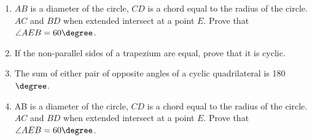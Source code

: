 \begin{enumerate}[label=\thesubsection.\arabic*,ref=\thesubsection.\theenumi]
\item $AB$ is a diameter of the circle, $CD$ is a chord equal to the radius of the circle. $AC$ and $BD$ when extended intersect at a point $E$. Prove that $\angle AEB = 60\degree$.
\item If the non-parallel sides of a trapezium are equal, prove that it is cyclic.
\item  The sum of either pair of opposite angles of a cyclic quadrilateral is 180$\degree$.
\item AB is a diameter of the circle, $CD$ is a chord equal to the radius of the circle. $AC$ and $BD$ when extended intersect at a point $E$. Prove that $\angle AEB = 60\degree$.
\end{enumerate}
